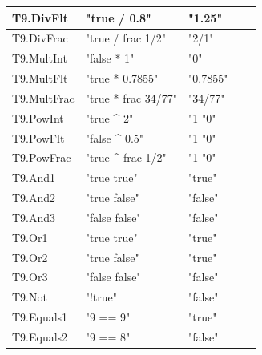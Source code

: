 \documentclass[a4paper, oneside, 11pt]{report}
\begin{document}
\begin{table}
\begin{tabular}{|p{1.5in}|p{1.5in}|p{1.6in}|p{1.6in}|p{2.4in}|}
\hline
T9.DivFlt                         & "true / 0.8"                            & "1.25"        &                \\ 
\hline
T9.DivFrac                        & "true / frac 1/2"                       & "2/1"         &                \\ 
\hline
T9.MultInt                        & "false * 1"                             & "0"           &                \\ 
\hline
T9.MultFlt                        & "true * 0.7855"                         & "0.7855"      &                \\ 
\hline
T9.MultFrac                       & "true * frac 34/77"                     & "34/77"       &                \\ 
\hline
T9.PowInt                         & "true \^{} 2"                           & "1 "0"        &                \\ 
\hline
T9.PowFlt                         & "false \^{} 0.5"                        & "1 "0"        &                \\ 
\hline
T9.PowFrac                        & "true \^{} frac 1/2"                    & "1 "0"        &                \\ 
\hline
T9.And1                           & "true  true"                            & "true"        &                \\ 
\hline
T9.And2                           & "true  false"                           & "false"       &                \\ 
\hline
T9.And3                           & "false  false"                          & "false"       &                \\ 
\hline
T9.Or1                            & "true \textbar{}\textbar{} true"        & "true"        &                \\ 
\hline
T9.Or2                            & "true \textbar{}\textbar{} false"       & "true"        &                \\ 
\hline
T9.Or3                            & "false \textbar{}\textbar{} false"      & "false"       &                \\ 
\hline
T9.Not                            & "!true"                                 & "false"       &                \\ 
\hline
T9.Equals1                        & "9 == 9"                                & "true"        &                \\ 
\hline
T9.Equals2                        & "9 == 8"                                & "false"       &                \\ 

\end{tabular}
\end{table}
\end{document}
